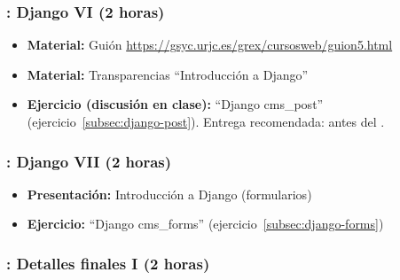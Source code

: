 \documentclass[a4paper,12pt]{article}
\begin{document}
\subsubsection{\juevesL: Django VI (2 horas)}
\label{cal:juevesL}

\begin{itemize}

 \item \textbf{Material:} Guión \url{https://gsyc.urjc.es/grex/cursosweb/guion5.html}
 \item \textbf{Material:} Transparencias ``Introducción a Django''
 \item \textbf{Ejercicio (discusión en clase):} ``Django cms\_post'' (ejercicio~\ref{subsec:django-post}).
  Entrega recomendada: antes del \juevesM.
\end{itemize}

\subsubsection{\juevesM: Django VII (2 horas)}
\label{cal:juevesM}

\begin{itemize}
  \item \textbf{Presentación:} Introducción a Django (formularios)
  \item \textbf{Ejercicio:} ``Django cms\_forms'' (ejercicio~\ref{subsec:django-forms}) \\
\end{itemize}



 \subsubsection{\juevesN: Detalles finales I  (2 horas)}
 \label{cal:juevesN}
\end{document}

